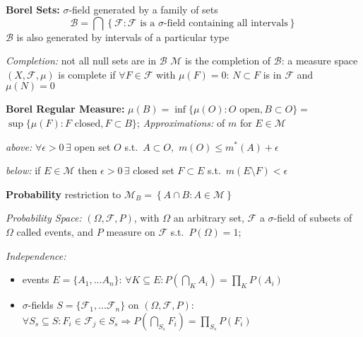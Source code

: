 \documentclass[8pt,twoside]{extarticle}
\begin{document}
\begin{multicols}{2}
\textbf{Borel Sets:} $\sigma$-field generated by a family of sets
$$\mathcal{B} =\bigcap \left\{\mathcal{F}:\mathcal{F} \text{ is a } \sigma\text{-field containing all intervals}\right\}$$
$\mathcal{B}$ is also generated by intervals of a particular type

\textit{Completion:} not all null sets are in $\mathcal{B}$ \newline
$\mathcal{M}$ is the completion of $\mathcal{B}$: a measure space $(X,\mathcal{F},\mu)$ is complete if $\forall F\in\mathcal{F}$ with $\mu(F)=0$: $N\subset F$ is in $\mathcal{F}$ and $\mu(N)=0$

\textbf{Borel Regular Measure:} $\mu(B)=\inf\{\mu(O): O \text{ open}, B\subset O\}{=}$ $\sup\{\mu(F): F \text{ closed}, F \subset B\}$;
\textit{Approximations:} of $m$ for $E\in \mathcal{M}$

\textit{above:}  
$\forall \epsilon>0\,\exists$ open set $O$ s.t.\ $A\subset O,$ $m(O)\leq m^*(A)+\epsilon$

\textit{below:} if $E \in \mathcal{M}$ then $\epsilon>0\, \exists$ closed set $F\subset E$ s.t.\ $m(E\setminus F)<\epsilon$


\textbf{Probability} restriction to $\mathcal{M}_B=\left\{A\cap B: A \in \mathcal{M}\right\}$

\textit{Probability Space:} $(\Omega, \mathcal{F}, P)$, with $\Omega$ an arbitrary set, $\mathcal{F}$ a $\sigma$-field of subsets of $\Omega$ called events, and $P$ measure on $\mathcal{F}$ s.t.\ $P(\Omega)=1$;


\textit{Independence:} 

\begin{itemize}[itemsep=0em, topsep=0pt, partopsep=0pt,parsep=0pt, leftmargin=1.0em]
\item events $E=\{A_1,... A_n\}$: $\forall K\subseteq E: P(\bigcap_K A_i)= \prod_K P(A_i)$
\item $\sigma$-fields $S=\{\mathcal{F}_1, ... \mathcal{F}_n\}$ on $(\Omega, \mathcal{F}, P)$: $\forall S_s\subseteq S: F_i \in \mathcal{F}_j \in S_s \Rightarrow P(\bigcap_{S_s} F_i)=\prod_{S_s}P(F_i)$
\end{itemize}


\end{multicols}
\end{document}
